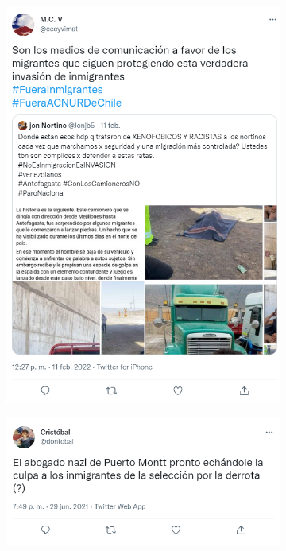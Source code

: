         
    
    \clearpage
    \begin{figure}[H]
        \caption{Random Selection of Tweets, Total Corpus}
        \label{random_tweets_tot}
        
        \centering
            \begin{subfigure}{0.49\textwidth}
                \centering
                \includegraphics[width=.99\linewidth]{figs/tweet_general_1.png}
            \end{subfigure}%
            \begin{subfigure}{0.49\textwidth}
                \centering
                \includegraphics[width=.99\linewidth]{figs/tweet_general_2.png}

\end{subfigure}
\end{figure}
